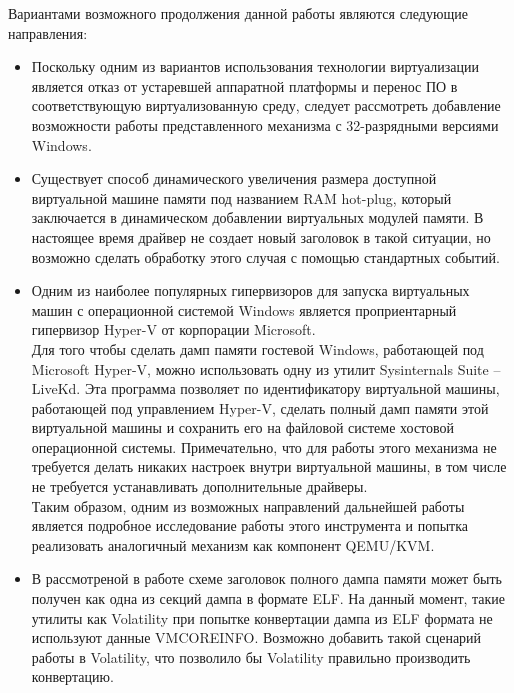 \documentclass{mipt-thesis-bs}
\begin{document}
Вариантами возможного продолжения данной работы являются следующие направления:
\begin{itemize}
\item Поскольку одним из вариантов использования технологии виртуализации является отказ от устаревшей аппаратной платформы и перенос ПО в соответствующую виртуализованную среду, следует рассмотреть добавление возможности работы представленного механизма с 32-разрядными версиями Windows.
\item Существует способ динамического увеличения размера доступной виртуальной машине памяти под названием RAM hot-plug, который заключается в динамическом добавлении виртуальных модулей памяти. В настоящее время драйвер не создает новый заголовок в такой ситуации, но возможно сделать обработку этого случая с помощью стандартных событий.
\item Одним из наиболее популярных гипервизоров для запуска виртуальных машин с операционной системой Windows является проприентарный гипервизор Hyper-V от корпорации Microsoft.\\Для того чтобы сделать дамп памяти гостевой Windows, работающей под Microsoft Hyper-V, можно использовать одну из утилит Sysinternals Suite -- LiveKd\cite{livekd-hv}. Эта программа позволяет по идентификатору виртуальной машины, работающей под управлением Hyper-V, сделать полный дамп памяти этой виртуальной машины и сохранить его на файловой системе хостовой операционной системы. Примечательно, что для работы этого механизма не требуется делать никаких настроек внутри виртуальной машины, в том числе не требуется устанавливать дополнительные драйверы.\\Таким образом, одним из возможных направлений дальнейшей работы является подробное исследование работы этого инструмента и попытка реализовать аналогичный механизм как компонент QEMU/KVM.
\newpage
\item В рассмотреной в работе схеме заголовок полного дампа памяти может быть получен как одна из секций дампа в формате ELF. На данный момент, такие утилиты как Volatility при попытке конвертации дампа из ELF формата не используют данные VMCOREINFO. Возможно добавить такой сценарий работы в Volatility, что позволило бы Volatility правильно производить конвертацию.
\end{itemize}

\printbibliography
\end{document}
